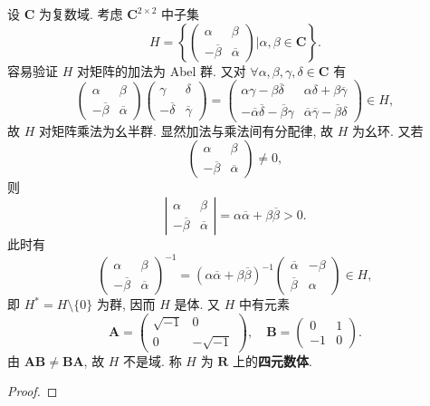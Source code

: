 \documentclass[../../main.tex]{subfiles}
\begin{document}
\begin{example}
设 \( \mathbf{C} \) 为复数域. 考虑 \( \mathbf{C}^{2 \times 2} \) 中子集
\[
H = \left\{ \begin{pmatrix} \alpha & \beta \\ -\overline{\beta} & \overline{\alpha} \end{pmatrix} \bigg| \alpha,\beta \in \mathbf{C} \right\}.
\]
容易验证 \( H \) 对矩阵的加法为 Abel 群. 又对 \( \forall \alpha,\beta,\gamma,\delta \in \mathbf{C} \) 有
\[
\begin{pmatrix} \alpha & \beta \\ -\overline{\beta} & \overline{\alpha} \end{pmatrix} \begin{pmatrix} \gamma & \delta \\ -\overline{\delta} & \overline{\gamma} \end{pmatrix} = \begin{pmatrix} \alpha\gamma - \beta\overline{\delta} & \alpha\delta + \beta\overline{\gamma} \\ -\overline{\alpha}\overline{\delta} - \overline{\beta}\gamma & \overline{\alpha}\overline{\gamma} - \overline{\beta}\delta \end{pmatrix} \in H,
\]
故 \( H \) 对矩阵乘法为幺半群. 显然加法与乘法间有分配律, 故 \( H \) 为幺环. 又若
\[
\begin{pmatrix} \alpha & \beta \\ -\overline{\beta} & \overline{\alpha} \end{pmatrix} \neq 0,
\]
则
\[
\left| \begin{array}{cc} \alpha & \beta \\ -\overline{\beta} & \overline{\alpha} \end{array} \right| = \alpha\overline{\alpha} + \beta\overline{\beta} > 0.
\]
此时有
\[
\begin{pmatrix} \alpha & \beta \\ -\overline{\beta} & \overline{\alpha} \end{pmatrix}^{-1} = (\alpha\overline{\alpha} + \beta\overline{\beta})^{-1} \begin{pmatrix} \overline{\alpha} & -\beta \\ \overline{\beta} & \alpha \end{pmatrix} \in H,
\]
即 \( H^* = H \setminus \{0\} \) 为群, 因而 \( H \) 是体. 又 \( H \) 中有元素
\[
\boldsymbol{A} = \begin{pmatrix} \sqrt{-1} & 0 \\ 0 & -\sqrt{-1} \end{pmatrix}, \quad \boldsymbol{B} = \begin{pmatrix} 0 & 1 \\ -1 & 0 \end{pmatrix}.
\]
由 \( \boldsymbol{AB} \neq \boldsymbol{BA} \), 故 \( H \) 不是域. 称 \( H \) 为 \( \mathbf{R} \) 上的\textbf{四元数体}.
\end{example}
\begin{proof}


\end{proof}
\end{document}
